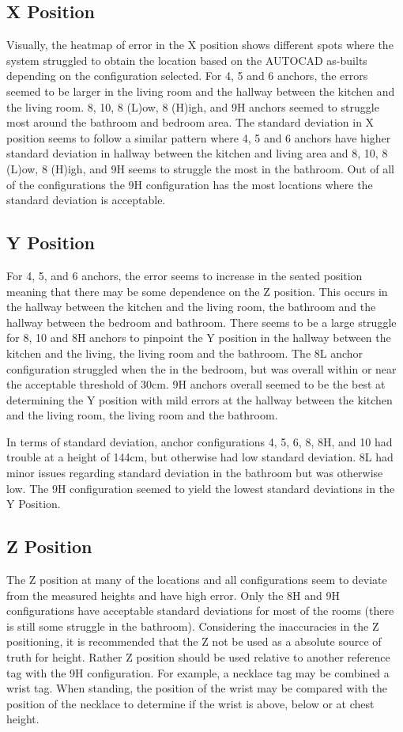 \subsection{X Position}
Visually, the heatmap of error in the X position shows different spots 
where the system struggled to obtain the location based on the AUTOCAD as-builts 
depending on the configuration selected.
For 4, 5 and 6 anchors, the errors seemed to be larger in the living room
and the hallway between the kitchen and the living room. 8, 10, 8 (L)ow, 8 (H)igh, and 9H
anchors seemed to struggle most around the bathroom and bedroom area. 
The standard deviation in X position seems to follow a similar pattern where 
4, 5 and 6 anchors have higher standard deviation in hallway between the kitchen and living
area and 8, 10, 8 (L)ow, 8 (H)igh, and 9H seems to struggle the most in the bathroom.
Out of all of the configurations the 9H configuration has the most locations
where the standard deviation is acceptable.

\subsection{Y Position}
For 4, 5, and 6 anchors, the error seems to increase in the seated position
meaning that there may be some dependence on the Z position. This occurs 
in the hallway between the kitchen and the living room, the bathroom and the 
hallway between the bedroom and bathroom.
There seems to be a large struggle for 8, 10 and 8H anchors to pinpoint the Y
position in the hallway between the kitchen and the living, the living room
and the bathroom. The 8L anchor configuration struggled when the in the bedroom,
but was overall within or near the acceptable threshold of 30cm. 9H anchors
overall seemed to be the best at determining the Y position with mild 
errors at the hallway between the kitchen and the living room, the living room 
and the bathroom.

In terms of standard deviation, anchor configurations 4, 5, 6, 8, 8H, and 10 
had trouble at a height of 144cm, but otherwise had low standard deviation.
8L had minor issues regarding standard deviation in the bathroom 
but was otherwise low. The 9H configuration seemed to yield
the lowest standard deviations in the Y Position. 

\subsection{Z Position}
The Z position at many of the locations and all configurations seem 
to deviate from the measured heights and have high error. 
Only the 8H and 9H configurations have acceptable standard deviations
for most of the rooms (there is still some struggle in the bathroom).
Considering the inaccuracies in the Z positioning, it is recommended
that the Z not be used as a absolute source of truth for height. 
Rather Z position should be used relative to another reference tag 
with the 9H configuration. For example, a necklace tag may be combined
a wrist tag. When standing, the position of the wrist may be compared 
with the position of the necklace to determine if the wrist is 
above, below or at chest height.

